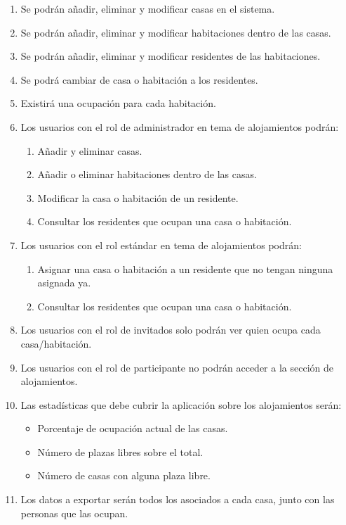 \begin{enumerate}[start=26,label={RF-\arabic*.}]

    \item Se podrán añadir, eliminar y modificar casas en el sistema.
    \item Se podrán añadir, eliminar y modificar habitaciones dentro de las casas.
    \item Se podrán añadir, eliminar y modificar residentes de las habitaciones.
    \item Se podrá cambiar de casa o habitación a los residentes.
    \item Existirá una ocupación para cada habitación.
    \item Los usuarios con el rol de administrador en tema de alojamientos podrán:
        \begin{enumerate}
            \item Añadir y eliminar casas.
            \item Añadir o eliminar habitaciones dentro de las casas.
            \item Modificar la casa o habitación de un residente.
            \item Consultar los residentes que ocupan una casa o habitación.
        \end{enumerate}
    \item Los usuarios con el rol estándar en tema de alojamientos podrán:
        \begin{enumerate}
            \item Asignar una casa o habitación a un residente que no tengan ninguna asignada ya.
            \item Consultar los residentes que ocupan una casa o habitación. 
        \end{enumerate}
    \item Los usuarios con el rol de invitados solo podrán ver quien ocupa cada casa/habitación.
    \item Los usuarios con el rol de participante no podrán acceder a la sección de alojamientos.
    \item \label{rf-es-ocupacion} Las estadísticas que debe cubrir la aplicación sobre los alojamientos serán:
        \begin{itemize}
            \item Porcentaje de ocupación actual de las casas.
            \item Número de plazas libres sobre el total.
            \item Número de casas con alguna plaza libre.
        \end{itemize}    
    \item Los datos a exportar serán todos los asociados a cada casa, junto con las personas que las ocupan.

\end{enumerate}

